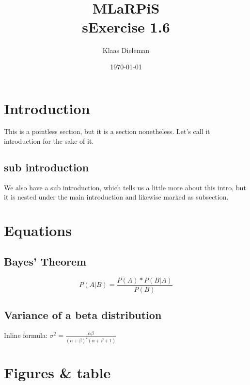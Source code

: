 \documentclass[10pt, a4paper, titlepage]{article}
\title{MLaRPiS\\ \small sExercise 1.6}
\author{Klaas Dieleman}
\date{\today}
\begin{document}
\maketitle
\newpage

\section{Introduction}
This is a pointless section, but it is a section nonetheless. Let's call it
introduction for the sake of it.

\subsection{sub introduction}
We also have a sub introduction, which tells us a little more about this intro,
but it is nested under the main introduction and likewise marked as subsection.

\section{Equations}

\subsection{Bayes' Theorem}
\[P(A|B)=\frac{P(A)*P(B|A)}{P(B)}\]

\subsection{Variance of a beta distribution}
Inline formula: $\sigma^2=\frac{\alpha\beta}{(\alpha+\beta)^2(\alpha+\beta+1)}$

\newpage

\section{Figures \& table}
\end{document}
